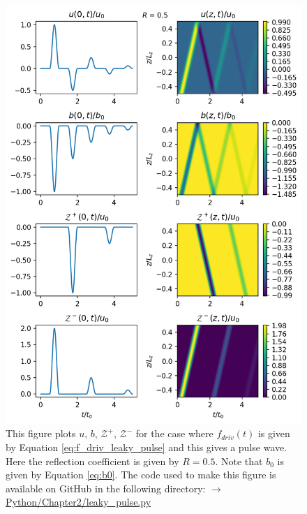\begin{figure}
    \centering
    \vspace{-30pt}
    \includegraphics[width=\textwidth,height=0.95\textheight,keepaspectratio]{figures/chapter02/leaky_pulse.png}
    \vspace{-10pt}
    \caption{This figure plots $u$, $b$, $\mathcal{Z}^{+}$, $\mathcal{Z^{-}}$ for the case where $f_{driv}(t)$ is given by Equation \eqref{eq:f_driv_leaky_pulse} and this gives a pulse wave. Here the reflection coefficient is given by $R=0.5$. Note that $b_0$ is given by Equation \eqref{eq:b0}. The code used to make this figure is available on GitHub in the following directory:\newline
    \href{https://github.com/aleksyprok/apkp_thesis/blob/main/Python/Chapter2/leaky_pulse.py}{$\rightarrow$ Python/Chapter2/leaky\_pulse.py}}
    \vspace{-30pt}
    \label{fig:leaky_pulse}
\end{figure}

